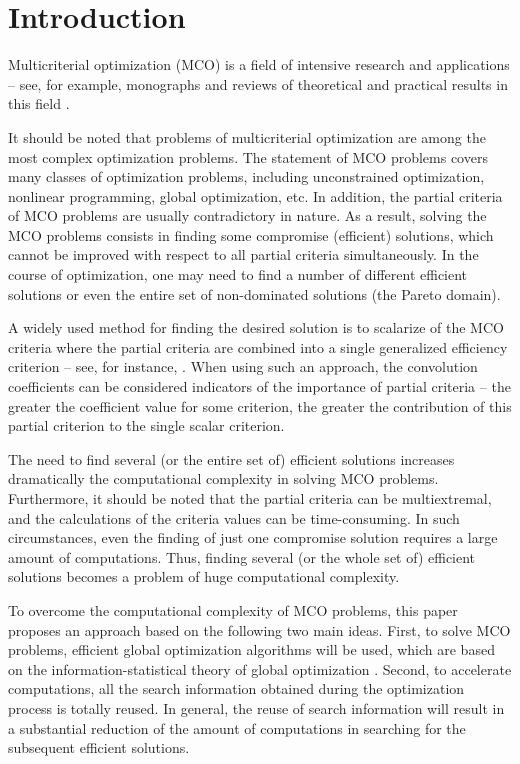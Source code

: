 \documentclass[smallcondensed]{svjour3}     %
\begin{document}
\section{Introduction} \label{intro}

Multicriterial optimization (MCO) is a field of intensive research and applications -- see, for example, monographs \cite{c5,c6,c7,c8,c26,c30,c49} and reviews of theoretical and practical results in this field \cite{c9,c11,c23,c28,c29,c48}. \par

It should be noted that problems of multicriterial optimization are among the most complex optimization problems. The statement of MCO problems covers many classes of optimization problems, including unconstrained optimization, nonlinear programming, global optimization, etc. In addition, the partial criteria of MCO problems are usually contradictory in nature. As a result, solving the MCO problems consists in finding some compromise (efficient) solutions, which cannot be improved with respect to all partial criteria simultaneously. In the course of optimization, one may need to find a number of different efficient solutions or even the entire set of non-dominated solutions (the Pareto domain). \par

A widely used method for finding the desired solution is to scalarize of the MCO criteria where the partial criteria are combined into a single generalized efficiency criterion -- see, for instance, \cite{c8,c9}. When using such an approach, the convolution coefficients can be considered indicators of the importance of partial criteria -- the greater the coefficient value for some criterion, the greater the contribution of this partial criterion to the single scalar criterion.\par

The need to find several (or the entire set of) efficient solutions increases dramatically the computational complexity in solving MCO problems. Furthermore, it should be noted that the partial criteria can be multiextremal, and the calculations of the criteria values can be time-consuming. In such circumstances, even the finding of just one compromise solution requires a large amount of computations. Thus, finding several (or the whole set of) efficient solutions becomes a problem of huge computational complexity. \par
 
To overcome the computational complexity of MCO problems, this paper proposes an approach based on the following two main ideas. First, to solve MCO problems, efficient global optimization algorithms will be used, which are based on the information-statistical theory of global optimization \cite{c37,c38}. Second, to accelerate computations, all the search information obtained during the optimization process is totally reused. In general, the reuse of search information will result in a substantial reduction of the amount of computations in searching for the subsequent efficient solutions. \par
\end{document}
